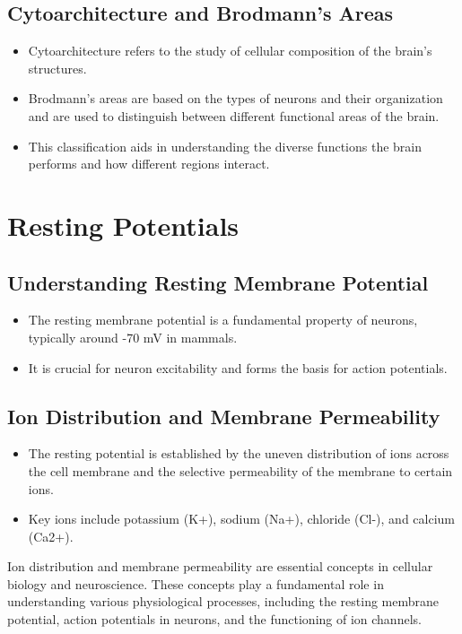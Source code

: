 \documentclass{article}
\begin{document}
\subsection{Cytoarchitecture and Brodmann's Areas}
\begin{itemize}
    \item Cytoarchitecture refers to the study of cellular composition of the brain's structures.
    \item Brodmann’s areas are based on the types of neurons and their organization and are used to distinguish between different functional areas of the brain.
    \item This classification aids in understanding the diverse functions the brain performs and how different regions interact.
\end{itemize}

\section{Resting Potentials}

\subsection{Understanding Resting Membrane Potential}
\begin{itemize}
    \item The resting membrane potential is a fundamental property of neurons, typically around -70 mV in mammals. 
    \item It is crucial for neuron excitability and forms the basis for action potentials.
\end{itemize}

\subsection{Ion Distribution and Membrane Permeability}
\begin{itemize}
    \item The resting potential is established by the uneven distribution of ions across the cell membrane and the selective permeability of the membrane to certain ions.
    \item Key ions include potassium (K+), sodium (Na+), chloride (Cl-), and calcium (Ca2+).
\end{itemize}
Ion distribution and membrane permeability are essential concepts in cellular biology and neuroscience. These concepts play a fundamental role in understanding various physiological processes, including the resting membrane potential, action potentials in neurons, and the functioning of ion channels.
\end{document}
